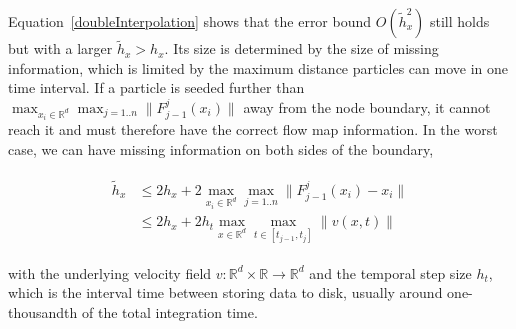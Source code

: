 Equation~\eqref{doubleInterpolation} shows that the error bound $O(\tilde h_x^2)$ still holds but with a larger $\tilde h_x>h_x$. 
%
Its size is determined by the size of missing information, which is limited by the maximum distance particles can move in one time interval.
%
If a particle is seeded further than $\max_{x_i\in\mathbb R^d} \max_{j=1..n} \| F_{j-1}^j(x_i)\|$ away from the node boundary, it cannot reach it and must therefore have the correct flow map information.
%
In the worst case, we can have missing information on both sides of the boundary, 
%
\begin{footnotesize}
\begin{eqnarray}
\begin{aligned}\label{hx}
\tilde h_x&\leq 2h_x+2\max_{x_i\in\mathbb R^d} \max_{j=1..n} \| F_{j-1}^j(x_i) - x_i\|\\
&\leq 2h_x+2 h_t \max_{x\in\mathbb R^d} \max_{t\in[t_{j-1},t_j]}\| v(x,t)\|
\end{aligned}
\end{eqnarray}
\end{footnotesize}
%
with the underlying velocity field $v:\mathbb R^d \times \mathbb R \to \mathbb R^d$ and the temporal step size $h_t$, which is the interval time between storing data to disk, usually around one-thousandth of the total integration time.
%
%

